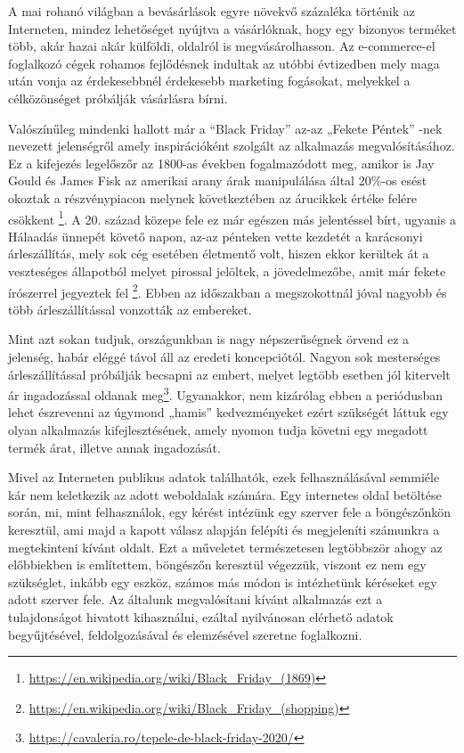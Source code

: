 A mai rohanó világban a bevásárlások egyre növekvő százaléka történik az Interneten, mindez lehetőséget nyújtva a vásárlóknak, hogy egy bizonyos terméket több, akár hazai akár külföldi, oldalról is megvásárolhasson. Az e-commerce-el foglalkozó cégek rohamos fejlődésnek indultak az utóbbi évtizedben mely maga után vonja az érdekesebbnél érdekesebb marketing fogásokat, melyekkel a célközönséget próbálják vásárlásra bírni.

Valószínűleg mindenki hallott már a “Black Friday” az-az „Fekete Péntek” -nek nevezett jelenségről amely inspirációként szolgált az alkalmazás megvalósításához. Ez a kifejezés legelőszőr az 1800-as években fogalmazódott meg, amikor is Jay Gould és James Fisk az amerikai arany árak manipulálása által 20\%-os esést okoztak a részvénypiacon melynek következtében az árucikkek értéke felére csökkent \footnote{\url{https://en.wikipedia.org/wiki/Black_Friday_(1869)}}. A 20. század közepe fele ez már egészen más jelentéssel bírt, ugyanis a Hálaadás ünnepét követő napon, az-az pénteken vette kezdetét a karácsonyi árleszállítás, mely sok cég esetében életmentő volt, hiszen ekkor kerültek át a veszteséges állapotból melyet pirossal jelöltek, a jövedelmezőbe, amit már fekete írószerrel jegyeztek fel \footnote{\url{https://en.wikipedia.org/wiki/Black_Friday_(shopping)}}. Ebben az időszakban a megszokottnál jóval nagyobb és több árleszállítással vonzották az embereket.

Mint azt sokan tudjuk, országunkban is nagy népszerűségnek örvend ez a jelenség, habár eléggé távol áll az eredeti koncepciótól. Nagyon sok mesterséges árleszállítással próbálják becsapni az embert, melyet legtöbb esetben jól kitervelt ár ingadozással oldanak meg\footnote{\url{https://cavaleria.ro/tepele-de-black-friday-2020/}}. Ugyanakkor, nem kizárólag ebben a periódusban lehet észrevenni az úgymond „hamis” kedvezményeket ezért szükségét láttuk egy olyan alkalmazás kifejlesztésének, amely nyomon tudja követni egy megadott termék árat, illetve annak ingadozását.

Mivel az Interneten publikus adatok találhatók, ezek felhasználásával semmiéle kár nem keletkezik az adott weboldalak számára. Egy internetes oldal betöltése során, mi, mint felhasználok, egy kérést intézünk egy szerver fele a böngészőnkön keresztül, ami majd a kapott válasz alapján felépíti és megjeleníti számunkra a megtekinteni kívánt oldalt. Ezt a műveletet természetesen legtöbbször ahogy az előbbiekben is említettem, böngészőn keresztül végezzük, viszont ez nem egy szükséglet, inkább egy eszköz, számos más módon is intézhetünk kéréseket egy adott szerver fele. Az általunk megvalósítani kívánt alkalmazás ezt a tulajdonságot hivatott kihasználni, ezáltal nyilvánosan elérhető adatok begyűjtésével, feldolgozásával és elemzésével szeretne foglalkozni.
